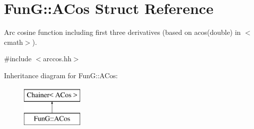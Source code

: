 \hypertarget{structFunG_1_1ACos}{\section{Fun\-G\-:\-:A\-Cos Struct Reference}
\label{structFunG_1_1ACos}
}


Arc cosine function including first three derivatives (based on acos(double) in $<$cmath$>$).  




{\ttfamily \#include $<$arccos.\-hh$>$}

Inheritance diagram for Fun\-G\-:\-:A\-Cos\-:\begin{figure}[H]
\begin{center}
\leavevmode
\includegraphics[height=2.000000cm]{structFunG_1_1ACos}
\end{center}
\end{figure}
